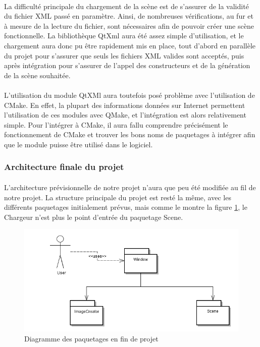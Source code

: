 \paragraph{}
La difficulté principale du chargement de la scène est de s'assurer de la validité du fichier XML passé en paramètre. Ainsi, de nombreuses vérifications, au fur et à mesure de la lecture du fichier, sont nécessaires afin de pouvoir créer une scène fonctionnelle. La bibliothèque QtXml aura été assez simple d'utilisation, et le chargement aura donc pu être rapidement mis en place, tout d'abord en parallèle du projet pour s'assurer que seuls les fichiers XML valides sont acceptés, puis après intégration pour s'assurer de l'appel des constructeurs et de la génération de la scène souhaitée.

\paragraph{}
L'utilisation du module QtXMl aura toutefois posé problème avec l'utilisation de CMake. En effet, la plupart des informations données sur Internet permettent l'utilisation de ces modules avec QMake, et l'intégration est alors relativement simple. Pour l'intégrer à CMake, il aura fallu comprendre précisément le fonctionnement de CMake et trouver les bons noms de paquetages à intégrer afin que le module puisse être utilisé dans le logiciel.

\subsubsection{Architecture finale du projet}
\paragraph{}
L'architecture prévisionnelle de notre projet n'aura que peu été modifiée au fil de notre projet. La structure principale du projet est resté la même, avec les différents paquetages initialement prévus, mais comme le montre la figure \ref{fig:archi}, le Chargeur n'est plus le point d'entrée du paquetage Scene.

\begin{figure}[h]
		\centering
                \includegraphics[scale=0.5]{paquetages.png}
		\caption{\label{fig:archi} Diagramme des paquetages en fin de projet \protect \footnotemark}
\end{figure}


